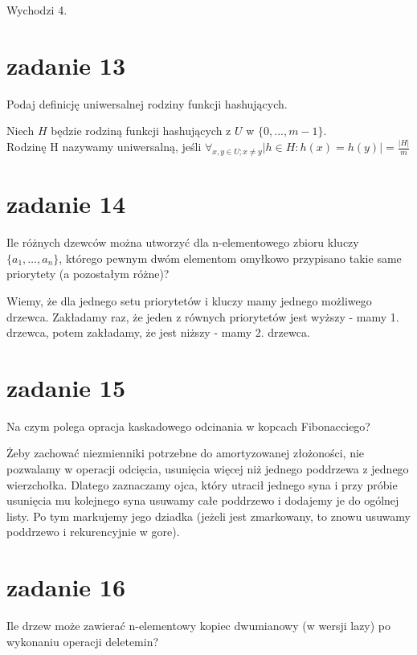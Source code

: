 \documentclass[svgnames]{report}
\begin{document}
Wychodzi 4.

\section{zadanie 13}
\begin{framed}
Podaj definicję uniwersalnej rodziny funkcji hashujących.
\end{framed}

Niech $H$ będzie rodziną funkcji hashujących z $U$ w $\{0,...,m-1\}$.\\ Rodzinę H nazywamy uniwersalną, jeśli $\forall_{x,y\in U ;x\neq y} |{h \in H : h(x)=h(y)}|= \frac {|H|} m$
 
\section{zadanie 14}
\begin{framed}
Ile różnych dzewców można utworzyć dla n-elementowego zbioru kluczy $\{ a_1, \ldots , a_n \}$, którego pewnym dwóm elementom omyłkowo przypisano takie same priorytety (a pozostałym różne)?
\end{framed}

Wiemy, że dla jednego setu priorytetów i kluczy mamy jednego możliwego drzewca. Zakładamy raz, że jeden z równych priorytetów jest wyższy - mamy 1. drzewca, potem zakładamy, że jest niższy - mamy 2. drzewca.
\section{zadanie 15}
\begin{framed}
Na czym polega opracja kaskadowego odcinania w kopcach Fibonacciego?
\end{framed}

Żeby zachować niezmienniki potrzebne do amortyzowanej złożoności, nie pozwalamy w operacji odcięcia, usunięcia więcej niż jednego poddrzewa z jednego wierzchołka.
Dlatego zaznaczamy ojca, który utracił jednego syna i przy próbie usunięcia mu kolejnego syna usuwamy całe poddrzewo i dodajemy je do ogólnej listy.
Po tym markujemy jego dziadka (jeżeli jest zmarkowany, to znowu usuwamy poddrzewo i rekurencyjnie w gore).

\section{zadanie 16}
\begin{framed}
Ile drzew może zawierać n-elementowy kopiec dwumianowy (w wersji lazy) po wykonaniu operacji deletemin?
\end{framed}
\end{document}
